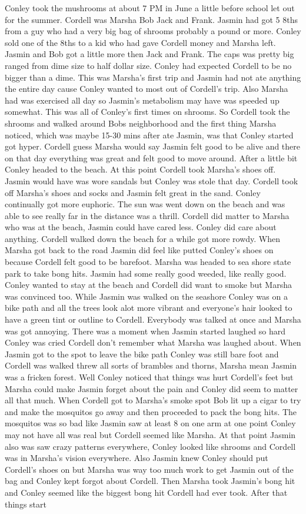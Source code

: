 \documentclass[12pt]{book}
\begin{document}
Conley took the mushrooms at about 7 PM in June a little before school let out for the summer. Cordell was Marsha Bob Jack and Frank. Jasmin had got 5 8ths from a guy who had a very big bag of shrooms probably a pound or more. Conley sold one of the 8ths to a kid who had gave Cordell money and Marsha left. Jasmin and Bob got a little more then Jack and Frank. The caps was pretty big ranged from dime size to half dollar size. Conley had expected Cordell to be no bigger than a dime. This was Marsha's first trip and Jasmin had not ate anything the entire day cause Conley wanted to most out of Cordell's trip. Also Marsha had was exercised all day so Jasmin's metabolism may have was speeded up somewhat. This was all of Conley's first times on shrooms. So Cordell took the shrooms and walked around Bobs neighborhood and the first thing Marsha noticed, which was maybe 15-30 mins after ate Jasmin, was that Conley started got hyper. Cordell guess Marsha would say Jasmin felt good to be alive and there on that day everything was great and felt good to move around. After a little bit Conley headed to the beach. At this point Cordell took Marsha's shoes off. Jasmin would have was wore sandals but Conley was stole that day. Cordell took off Marsha's shoes and socks and Jasmin felt great in the sand. Conley continually got more euphoric. The sun was went down on the beach and was able to see really far in the distance was a thrill. Cordell did matter to Marsha who was at the beach, Jasmin could have cared less. Conley did care about anything. Cordell walked down the beach for a while got more rowdy. When Marsha got back to the road Jasmin did feel like putted Conley's shoes on because Cordell felt good to be barefoot. Marsha was headed to sea shore state park to take bong hits. Jasmin had some really good weeded, like really good. Conley wanted to stay at the beach and Cordell did want to smoke but Marsha was convinced too. While Jasmin was walked on the seashore Conley was on a bike path and all the trees look alot more vibrant and everyone's hair looked to have a green tint or outline to Cordell. Everybody was talked at once and Marsha was got annoying. There was a moment when Jasmin started laughed so hard Conley was cried Cordell don't remember what Marsha was laughed about. When Jasmin got to the spot to leave the bike path Conley was still bare foot and Cordell was walked threw all sorts of brambles and thorns, Marsha mean Jasmin was a fricken forest. Well Conley noticed that things was hurt Cordell's feet but Marsha could make Jasmin forget about the pain and Conley did seem to matter all that much. When Cordell got to Marsha's smoke spot Bob lit up a cigar to try and make the mosquitos go away and then proceeded to pack the bong hits. The mosquitos was so bad like Jasmin saw at least 8 on one arm at one point Conley may not have all was real but Cordell seemed like Marsha. At that point Jasmin also was saw crazy patterns everywhere, Conley looked like shrooms and Cordell was in Marsha's vision everywhere. Also Jasmin knew Conley should put Cordell's shoes on but Marsha was way too much work to get Jasmin out of the bag and Conley kept forgot about Cordell. Then Marsha took Jasmin's bong hit and Conley seemed like the biggest bong hit Cordell had ever took. After that things start 
\end{document}
